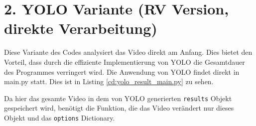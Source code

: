 \section{2. YOLO Variante (RV Version, direkte Verarbeitung)}{
	\label{py:YOLO_res_vers}
	Diese Variante des Codes analysiert das Video direkt am Anfang. Dies bietet den Vorteil, dass durch die effiziente Implementierung von YOLO die Gesamtdauer des Programmes verringert wird. Die Anwendung von YOLO findet direkt in main.py statt. Dies ist in Listing \ref{cd:yolo_result_main.py} zu sehen.
	
	Da hier das gesamte Video in dem von YOLO generierten \lstinline|results| Objekt gespeichert wird, benötigt die Funktion, die das Video verändert nur dieses Objekt und das \lstinline|options| Dictionary. \\
	

}
